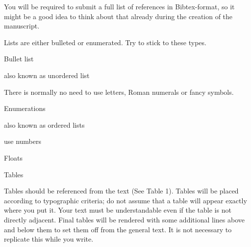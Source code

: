 \begin{styleTextbody}
You will be required to submit a full list of references in Bibtex-format, so it might be a good idea to think about that already during the creation of the manuscript.
\end{styleTextbody}

\begin{styleTextbody}
Lists are either bulleted or enumerated. Try to stick to these types. 
\end{styleTextbody}

\begin{listLileveli}
\item 
\begin{styleTextbody}
Bullet list 
\end{styleTextbody}

\item 
\begin{styleTextbody}
also known as unordered list
\end{styleTextbody}

\end{listLileveli}
\begin{styleTextbody}
There is normally no need to use letters, Roman numerals or fancy symbols.
\end{styleTextbody}

\setcounter{listLiileveli}{0}
\begin{listLiileveli}
\item 
\begin{styleTextbody}
Enumerations
\end{styleTextbody}

\item 
\begin{styleTextbody}
also known as ordered lists
\end{styleTextbody}

\item 
\begin{styleTextbody}
use numbers
\end{styleTextbody}

\end{listLiileveli}
\begin{styleHeadingi}
Floats
\end{styleHeadingi}

\begin{styleHeadingii}
Tables 
\end{styleHeadingii}

\begin{styleStandard}
Tables should be referenced from the text (See Table 1). Tables will be placed according to typographic criteria; do not assume that a table will appear exactly where you put it. Your text must be understandable even if the table is not directly adjacent. Final tables will be rendered with some additional lines above and below them to set them off from the general text. It is not necessary to replicate this while you write.
\end{styleStandard}

